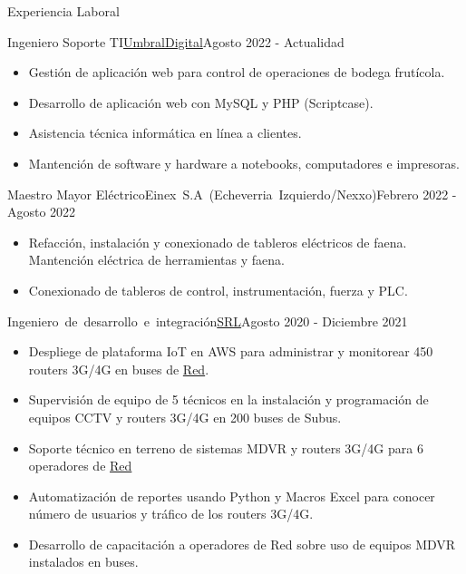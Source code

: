 \documentclass[]{mcdowellcv}
\begin{document}
	\makeheader
	
	\begin{cvsection}{Experiencia Laboral}
		\begin{cvsubsection}{Ingeniero Soporte TI}{\mbox{\href{https://umbraldigital.cl/}{UmbralDigital}}}{Agosto 2022 - Actualidad}		
			\begin{itemize}
				\item Gestión de aplicación web para control de operaciones de bodega frutícola.
				\item Desarrollo de aplicación web con MySQL y PHP (Scriptcase).
				\item Asistencia técnica informática en línea a clientes.
				\item Mantención de software y hardware a notebooks, computadores e impresoras.
			\end{itemize}
		\end{cvsubsection}
		\begin{cvsubsection}{Maestro Mayor Eléctrico}{\mbox{Einex S.A (Echeverria Izquierdo/Nexxo)}}{Febrero 2022 - Agosto 2022}		
			\begin{itemize}
				\item Refacción, instalación y conexionado de tableros eléctricos de faena. Mantención eléctrica de herramientas y faena.
				\item Conexionado de tableros de control, instrumentación, fuerza y PLC.
			\end{itemize}
		\end{cvsubsection}
		
		\begin{cvsubsection}{\mbox{Ingeniero de desarrollo e integración}}{\href{https://www.srl.cl/empresa/}{SRL}}{Agosto 2020 - Diciembre 2021}	
			\begin{itemize}
				\item Despliege de plataforma IoT en AWS para administrar y monitorear 450 routers 3G/4G en buses de \href{https://www.red.cl/}{Red}. 
				\item Supervisión de equipo de 5 técnicos en la instalación y programación de equipos CCTV y routers 3G/4G en 200 buses de Subus.
				\item Soporte técnico en terreno de sistemas MDVR y routers 3G/4G para 6 operadores de \href{https://www.red.cl/}{Red}
				\item Automatización de reportes usando Python y Macros Excel para conocer número de usuarios y tráfico de los routers 3G/4G.
				\item Desarrollo de capacitación a operadores de Red sobre uso de equipos MDVR instalados en buses.
			\end{itemize}
		\end{cvsubsection}
		

\end{cvsection}
\end{document}
